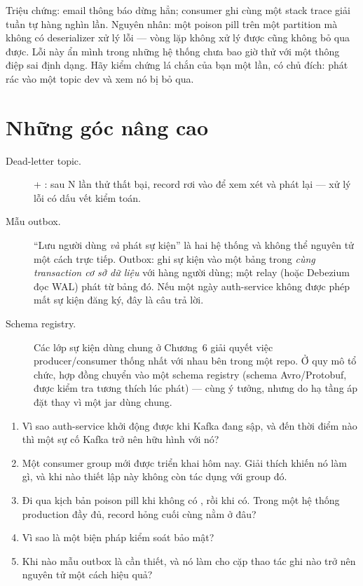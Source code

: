 \begin{pitfall}
Triệu chứng: email thông báo dừng hẳn; consumer ghi cùng một stack trace
giải tuần tự hàng nghìn lần. Nguyên nhân: một poison pill trên một
partition mà không có deserializer xử lý lỗi --- vòng lặp không xử lý
được cũng không bỏ qua được. Lỗi này ẩn mình trong những hệ thống chưa
bao giờ thử với một thông điệp sai định dạng. Hãy kiểm chứng lá chắn của
bạn một lần, có chủ đích: phát rác vào một topic dev và xem nó bị bỏ
qua.
\end{pitfall}

\section{Những góc nâng cao}

\begin{description}
  \item[Dead-letter topic.]  +
  : sau N lần thử thất bại,
  record rơi vào  để xem xét và phát lại --- xử lý lỗi
  có dấu vết kiểm toán.
  \item[Mẫu outbox.] ``Lưu người dùng \emph{và} phát sự kiện'' là hai hệ
  thống và không thể nguyên tử một cách trực tiếp. Outbox: ghi sự kiện
  vào một bảng  trong \emph{cùng transaction cơ sở dữ liệu}
  với hàng người dùng; một relay (hoặc Debezium đọc WAL) phát từ bảng đó.
  Nếu một ngày auth-service không được phép mất sự kiện đăng ký, đây là
  câu trả lời.
  \item[Schema registry.] Các lớp sự kiện dùng chung ở Chương~6 giải
  quyết việc producer/consumer thống nhất với nhau bên trong một repo. Ở
  quy mô tổ chức, hợp đồng chuyển vào một schema registry (schema
  Avro/Protobuf, được kiểm tra tương thích lúc phát) --- cùng ý tưởng,
  nhưng do hạ tầng áp đặt thay vì một jar dùng chung.
\end{description}

\begin{quiz}
\begin{enumerate}
  \item Vì sao auth-service khởi động được khi Kafka đang sập, và đến
  thời điểm nào thì một sự cố Kafka trở nên hữu hình với nó?
  \item Một consumer group mới được triển khai hôm nay. Giải thích
   khiến nó làm gì, và khi nào thiết
  lập này không còn tác dụng với group đó.
  \item Đi qua kịch bản poison pill khi không có
  , rồi khi có. Trong một hệ thống
  production đầy đủ, record hỏng cuối cùng nằm ở đâu?
  \item Vì sao  là một biện pháp kiểm
  soát bảo mật?
  \item Khi nào mẫu outbox là cần thiết, và nó làm cho cặp thao tác ghi
  nào trở nên nguyên tử một cách hiệu quả?
\end{enumerate}
\end{quiz}
